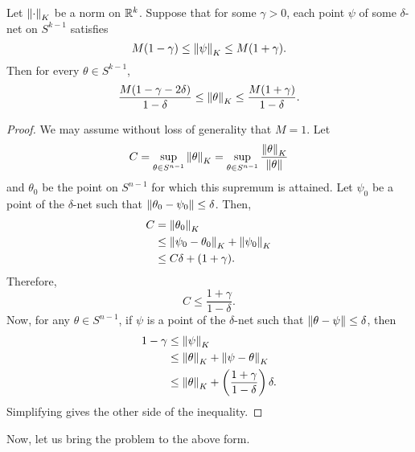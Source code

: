 \begin{lemma}
Let $\left\lVert\cdot\right\rVert_K$ be a norm on $\mathbb{R}^k$. Suppose that for some $\gamma>0$, each point $\psi$ of some $\delta$-net on $S^{k-1}$ satisfies
\[ M(1-\gamma)\leq\left\lVert\psi\right\rVert_K\leq M(1+\gamma). \]
Then for every $\theta\in S^{k-1}$,
\[ \frac{M(1-\gamma-2\delta)}{1-\delta} \leq \left\lVert\theta\right\rVert_K \leq \frac{M(1+\gamma)}{1-\delta}. \]
\end{lemma}
\begin{proof}
We may assume without loss of generality that $M=1$. Let
\[ C = \sup_{\theta\in S^{n-1}} \left\lVert\theta\right\rVert_K = \sup_{\theta\in S^{n-1}} \frac{\left\lVert\theta\right\rVert_K}{\left\lVert\theta\right\rVert} \]
and $\theta_0$ be the point on $S^{n-1}$ for which this supremum is attained.
Let $\psi_0$ be a point of the $\delta$-net such that $\left\lVert\theta_0-\psi_0\right\rVert\leq\delta$. Then,
\begin{align*}
    C &= \left\lVert\theta_0\right\rVert_K \\
    &\leq \left\lVert\psi_0-\theta_0\right\rVert_K + \left\lVert\psi_0\right\rVert_K \\
    &\leq C\delta + (1+\gamma).
\end{align*}
Therefore,
\[ C \leq \frac{1+\gamma}{1-\delta}. \]
Now, for any $\theta\in S^{n-1}$, if $\psi$ is a point of the $\delta$-net such that $\left\lVert\theta-\psi\right\rVert\leq\delta$, then
\begin{align*}
    1-\gamma &\leq \left\lVert\psi\right\rVert_K \\
    &\leq \left\lVert\theta\right\rVert_K + \left\lVert\psi-\theta\right\rVert_K \\
    &\leq \left\lVert\theta\right\rVert_K + \left(\frac{1+\gamma}{1-\delta}\right)\delta.
\end{align*}
Simplifying gives the other side of the inequality.
\end{proof}

Now, let us bring the problem to the above form.\\

